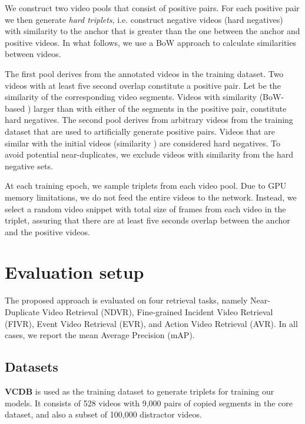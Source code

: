 \documentclass[10pt,twocolumn,letterpaper]{article}
\begin{document}
We construct two video pools that consist of positive pairs. For each positive pair we then generate \textit{hard triplets}, i.e. construct negative videos (hard negatives) with similarity to the anchor that is greater than the one between the anchor and positive videos. In what follows, we use a BoW approach \cite{kordopatis2017a} to calculate similarities between videos. 

The first pool derives from the annotated videos in the training dataset. Two videos with at least five second overlap constitute a positive pair. Let  be the similarity of the corresponding video segments. Videos with similarity (BoW-based \cite{kordopatis2017a}) larger than  with either of the segments in the positive pair, constitute hard negatives. The second pool derives from arbitrary videos from the training dataset that are used to artificially generate positive pairs. Videos that are similar with the initial videos (similarity ) are considered  hard negatives. To avoid potential near-duplicates, we exclude videos with similarity  from the hard negative sets.

At each training epoch, we sample  triplets from each video pool. Due to GPU memory limitations, we do not feed the entire videos to the network. Instead, we select a random video snippet with total size of  frames from each video in the triplet, assuring that there are at least five seconds overlap between the anchor and the positive videos.








\section{Evaluation setup}
\label{sec:experiments}

The proposed approach is evaluated on four retrieval tasks, namely Near-Duplicate Video Retrieval (NDVR), Fine-grained Incident Video Retrieval (FIVR), Event Video Retrieval (EVR), and Action Video Retrieval (AVR). In all cases, we report the mean Average Precision (mAP).

\subsection{Datasets}
\label{sec:datasets}

\textbf{VCDB} \cite{jiang2014} is used as the training dataset to generate triplets for training our models. It consists of 528 videos with 9,000 pairs of copied segments in the core dataset, and also a subset of 100,000 distractor videos.
\end{document}
